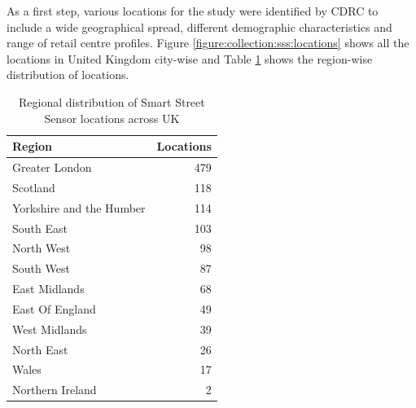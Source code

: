 As a first step, various locations for the study were identified by CDRC to include a wide geographical spread, different demographic characteristics and range of retail centre profiles.
Figure \ref{figure:collection:sss:locations} shows all the locations in United Kingdom city-wise and Table \ref{table:collection:sss:locations} shows the region-wise distribution of locations.

\begin{table}
  \footnotesize
  \begin{center} 
    \begin{tabular}{lr} 
      \toprule
      Region & Locations \\
      \midrule
      Greater London & 479 \\
      Scotland & 118 \\
      Yorkshire and the Humber & 114 \\
      South East & 103 \\
      North West & 98 \\
      South West & 87 \\
      East Midlands & 68 \\
      East Of England & 49 \\
      West Midlands & 39 \\
      North East & 26 \\
      Wales & 17 \\
      Northern Ireland & 2 \\
      \bottomrule
    \end{tabular}
  \end{center}
  \caption{Regional distribution of Smart Street Sensor locations across UK}
  \label{table:collection:sss:locations}
\end{table}

